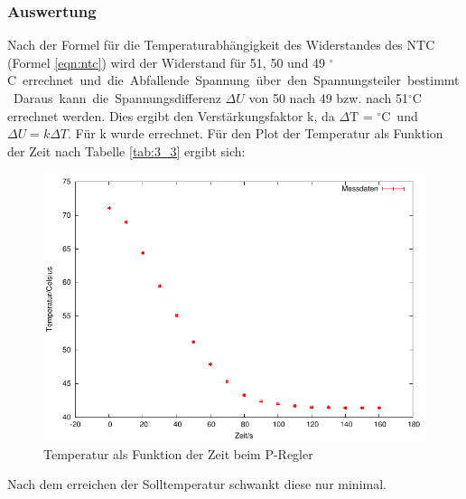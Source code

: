 \documentclass[12pt,a4paper]{article}
\begin{document}
\subsubsection*{Auswertung}
Nach der Formel für die Temperaturabhängigkeit des Widerstandes des NTC (Formel \ref{eqn:ntc}) wird der Widerstand für 51, 50 und 49 \unit[]{$^{\circ}$C} errechnet und die Abfallende Spannung über den Spannungsteiler bestimmt. Daraus kann die Spannungsdifferenz $\Delta U$ von 50 nach 49 bzw. nach 51$^{\circ}$C errechnet werden. Dies ergibt den Verstärkungsfaktor k, da $\Delta$T = \unit[1]{$^\circ$C} und $\Delta U = k \Delta T$. Für k wurde  errechnet.
Für den Plot der Temperatur als Funktion der Zeit nach Tabelle \ref{tab:3_3} ergibt sich:
\begin{figure}[H]
  \centering
    \includegraphics[scale = 1]{3_3.pdf}
  	\caption[Temperatur als Funktion der Zeit beim P-Regler]{Temperatur als Funktion der Zeit beim P-Regler}
  \label{fig:P-Regler_Plot_3_3}
\end{figure}
Nach dem erreichen der Solltemperatur schwankt diese nur minimal.
\end{document}
